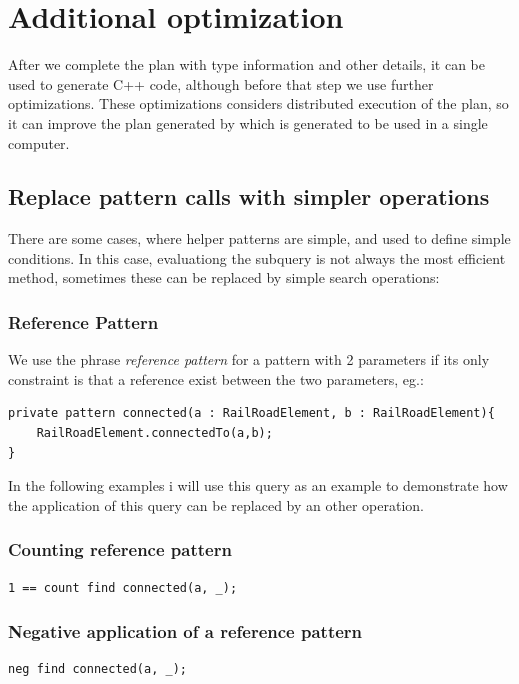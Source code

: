\section{Additional optimization}

After we complete the plan with type information and other details, it can be used to generate C++ code, although before that step we use further optimizations. 
These optimizations considers distributed execution of the plan, so it can improve the plan generated by \viatra{} which is generated to be used in a single computer.


\subsection{Replace pattern calls with simpler operations}
There are some cases, where helper patterns are simple, and used to define simple conditions. 
In this case, evaluationg the subquery is not always the most efficient method, sometimes these can be replaced by simple search operations:

\subsubsection{Reference Pattern}
We use the phrase \emph{reference pattern} for a pattern with 2 parameters if its only constraint is that a reference exist between the two parameters, eg.:
\begin{lstlisting}[language = vql]
private pattern connected(a : RailRoadElement, b : RailRoadElement){
	RailRoadElement.connectedTo(a,b);
}
\end{lstlisting}

In the following examples i will use this query as an example to demonstrate how the application of this query can be replaced by an other operation.

\subsubsection{Counting reference pattern}
\begin{lstlisting}[language = vql]
1 == count find connected(a, _);
\end{lstlisting}


\subsubsection{Negative application of a reference pattern}

\begin{lstlisting}[language = vql]
neg find connected(a, _);
\end{lstlisting}

